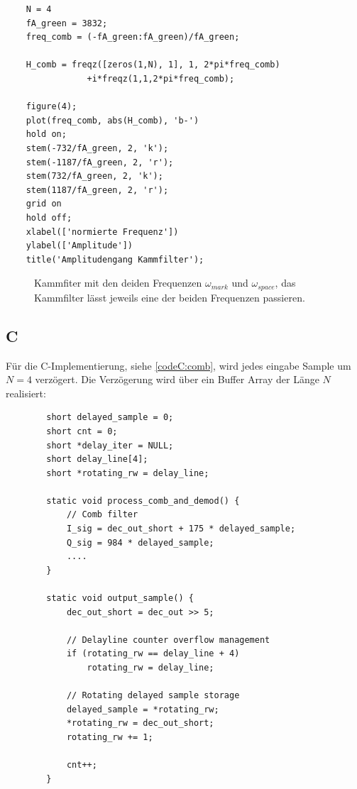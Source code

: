 \documentclass{article}
\begin{document}
\begin{listing}
    \label{codeM:comb}
    \caption{In Matlab wird Überprüft ob die Berechnung des $N$ korrekt sind, indem das Filter mit den Frequenzen
    $w_{mark}$ und $w_{space}$ geplottet wird, siehe Abb.~\ref{fig:comb}. Es wird kontrolliert ob die Nullstellen in den richten Punkten auf der Frequenzachse liegen.}
\begin{verbatim}
    N = 4
    fA_green = 3832;
    freq_comb = (-fA_green:fA_green)/fA_green;
    
    H_comb = freqz([zeros(1,N), 1], 1, 2*pi*freq_comb)
                +i*freqz(1,1,2*pi*freq_comb);
    
    figure(4);
    plot(freq_comb, abs(H_comb), 'b-')
    hold on;
    stem(-732/fA_green, 2, 'k');
    stem(-1187/fA_green, 2, 'r');
    stem(732/fA_green, 2, 'k');
    stem(1187/fA_green, 2, 'r');
    grid on
    hold off;
    xlabel(['normierte Frequenz'])
    ylabel(['Amplitude'])
    title('Amplitudengang Kammfilter');
\end{verbatim}
\end{listing}

\begin{figure}[!h]
    \label{fig:comb}
    \centering
    \def\svgscale{0.3}
    \def\svgwidth{0.8\columnwidth}
    
    \caption{Kammfiter mit den deiden Frequenzen $\omega_{mark}$ und $\omega_{space}$, das Kammfilter lässt jeweils eine der beiden Frequenzen passieren.}
\end{figure}
\subsection{C}
Für die C-Implementierung, siehe \ref{codeC:comb}, wird jedes eingabe Sample um $N = 4$ verzögert.
Die Verzögerung wird über ein Buffer Array der Länge $N$ realisiert:
\begin{listing}\label{codeC:comb}
    \caption{C-Implementierung des Kammfilters mithilfe eines Verzögerer Buffers}
    \begin{verbatim}
        short delayed_sample = 0;
        short cnt = 0;
        short *delay_iter = NULL;
        short delay_line[4];
        short *rotating_rw = delay_line;
 
        static void process_comb_and_demod() {
            // Comb filter
            I_sig = dec_out_short + 175 * delayed_sample;
            Q_sig = 984 * delayed_sample;
            ....
        }

        static void output_sample() {
            dec_out_short = dec_out >> 5;

            // Delayline counter overflow management
            if (rotating_rw == delay_line + 4)
                rotating_rw = delay_line;
            
            // Rotating delayed sample storage
            delayed_sample = *rotating_rw;
            *rotating_rw = dec_out_short;
            rotating_rw += 1;

            cnt++;
        }
    \end{verbatim}
\end{listing}
\end{document}
